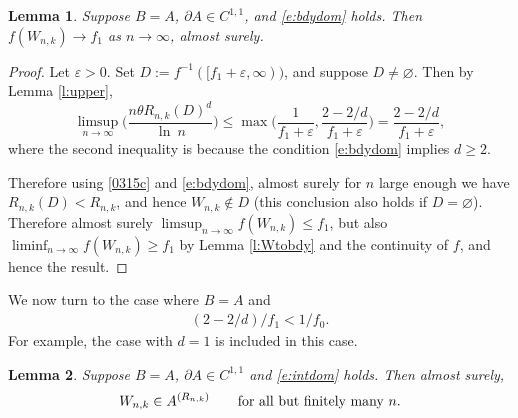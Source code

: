 \documentclass[12pt]{article}
\renewcommand{\emptyset}{\varnothing}
\newcommand{\eps}{\varepsilon}
\newcommand{\dist}{{\rm dist}}
\renewcommand{\log}{{\ln \:}}
\newtheorem{lemm}{Lemma}
\begin{document}
\begin{lemm}
	\label{l:ftof1}
	Suppose $B=A$, $\partial A \in C^{1,1}$,
	and \eqref{e:bdydom} holds.
	Then
	$f(W_{n,k}) \to f_1$ as $n \to \infty$, almost surely.
\end{lemm}
\begin{proof}
	Let $\eps > 0$.
	Set $D := f^{-1}([f_1+ \eps, \infty))$,
	and suppose $D \neq \emptyset$.
	Then %
	by Lemma \ref{l:upper},
	$$
	\limsup_{n \to \infty} \Big(\frac{n \theta R_{n,k}(D)^d}{\log n} \Big)
	\leq \max \Big( \frac{1}{f_1 +  \eps},
	\frac{2-2/d}{f_1 +  \eps} \Big)
	= \frac{2-2/d}{f_1+  \eps},
	$$
	where the second inequality is because the condition
	\eqref{e:bdydom} implies $d \geq 2$.


	Therefore using \eqref{0315c} and \eqref{e:bdydom}, 
	almost surely for $n$ large enough we have
	$R_{n,k}(D) < R_{n,k}$, and hence
	$W_{n,k} \notin D$ (this conclusion also holds
	if $D = \emptyset$). Therefore almost surely
	$\limsup_{n \to \infty} f(W_{n,k}) \leq f_1$,
	but also $\liminf_{n \to \infty} f(W_{n,k}) \geq f_1$ 
	by Lemma \ref{l:Wtobdy} and the continuity of $f$,
	and hence the result.
\end{proof}
We now turn to the case where $B=A$ and
\begin{align}
(2 -2/d)/ f_1 < 1/f_0.
	\label{e:intdom}
\end{align}
For example, the  case with $d=1$ is included in this case.
\begin{lemm}
	\label{l:Wtoint}
	Suppose $B=A$, $\partial A \in C^{1,1}$
	and \eqref{e:intdom} holds. Then 
	almost surely,
	\begin{align}
		W_{n,k} \in A^{(R_{n,k})}
	~~~~~~\mbox{\rm for all but finitely many } n.
		\label{e:Wint}
	\end{align}
\end{lemm}
\end{document}
